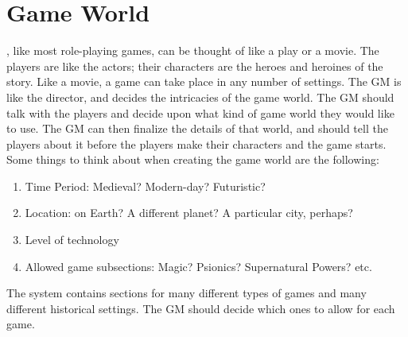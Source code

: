 \documentclass[twoside]{book}
\begin{document}
    

\section{Game World}
    \APATHY{}, like most role-playing games, can be
            thought of like a play or a movie. The players are like the
            actors; their characters are the heroes and heroines of the
            story. Like a movie, a game can take place in any number of
            settings. The GM is like the director, and decides the
            intricacies of the game world.
           The GM should talk with the players and decide upon
             what kind of game world they would like to use. The GM can
             then finalize the details of that world, and should tell the
             players about it before the players make their characters
             and the game starts.  Some things to think about when creating the game
             world are the following: 
\begin{enumerate}
      
  \item   
                 Time Period: Medieval? Modern-day? Futuristic?
                 
            
  \item   
                  Location: on Earth? A different planet? A
                 particular city, perhaps? 
            
  \item   
                Level of technology   
            
  \item   
                  Allowed game subsections: Magic? Psionics?
                 Supernatural Powers? etc. 
            
\end{enumerate}
   The \APATHY{}  system contains sections for many
            different types of games and many different historical
            settings. The GM should decide which ones to allow for each
            game.
          
    
\end{document}
